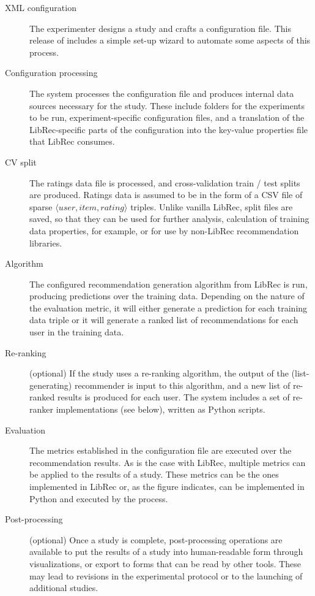 \begin{description}

    \item [XML configuration] The experimenter designs a study and crafts a configuration file. This release of \libauto{} includes a simple set-up wizard to automate some aspects of this process.

    \item [Configuration processing] The system processes the configuration file and produces internal data sources necessary for the study. These include folders for the experiments to be run, experiment-specific configuration files, and a translation of the LibRec-specific parts of the configuration into the key-value properties file that LibRec consumes.

    \item [CV split] The ratings data file is processed, and cross-validation train / test splits are produced. Ratings data is assumed to be in the form of a CSV file of sparse $\langle user, item, rating \rangle$ triples. Unlike vanilla LibRec, split files are saved, so that they can be used for further analysis, calculation of training data properties, for example, or for use by non-LibRec recommendation libraries.

    \item [Algorithm] The configured recommendation generation algorithm from LibRec is run, producing predictions over the training data. Depending on the nature of the evaluation metric, it will either generate a prediction for each training data triple or it will generate a ranked list of recommendations for each user in the training data. 
    
    \item [Re-ranking] (optional) If the study uses a re-ranking algorithm, the output of the (list-generating) recommender is input to this algorithm, and a new list of re-ranked results is produced for each user. The system includes a set of re-ranker implementations (see below), written as Python scripts. 

    \item [Evaluation] The metrics established in the configuration file are executed over the recommendation results. As is the case with LibRec, multiple metrics can be applied to the results of a study. These metrics can be the ones implemented in LibRec or, as the figure indicates, can be implemented in Python and executed by the \libauto{} process.

    \item [Post-processing] (optional) Once a study is complete, post-processing operations are available to put the results of a study into human-readable form through visualizations, or export to forms that can be read by other tools. These may lead to revisions in the experimental protocol or to the launching of additional studies.

\end{description}

